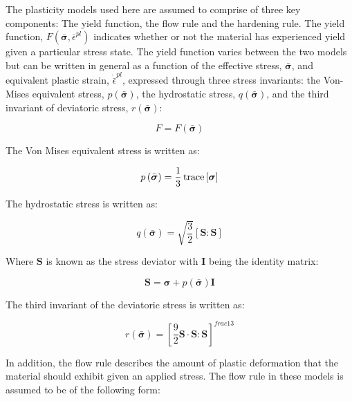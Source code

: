 The plasticity models used here are assumed to comprise of three key components: The yield function, the flow rule and the hardening rule. The yield function, $F\left(\bar{\boldsymbol{\sigma}},\bar{\epsilon}^{pl}\right)$ indicates whether or not the material has experienced yield given a particular stress state. The yield function varies between the two models but can be written in general as a function of the effective stress, $\bar{\boldsymbol{\sigma}}$, and equivalent plastic strain, $\dot{\bar{\epsilon}}^{pl}$, expressed through three stress invariants: the Von-Mises equivalent stress, $p\left(\bar{\boldsymbol{\sigma}}\right)$, the hydrostatic stress, $q\left(\bar{\boldsymbol{\sigma}}\right)$, and the third invariant of deviatoric stress, $r\left(\bar{\boldsymbol{\sigma}}\right)$:

\begin{equation}
    F = F\left(\bar{\boldsymbol{\sigma}}\right)
\label{eqn:gen1}
\end{equation}

The Von Mises equivalent stress is written as:

\begin{equation}
p\left(\bar{\boldsymbol{\sigma}}\right) = \frac{1}{3}\operatorname{trace}\left[\boldsymbol{\sigma}\right]
\label{eqn:gen2}
\end{equation}

The hydrostatic stress is written as:

\begin{equation}
q\left(\bar{\boldsymbol{\sigma}}\right)=\sqrt{\frac{3}{2}}\left[\mathbf{S}:\mathbf{S}\right]
\label{eqn:gen3}
\end{equation}

Where $\mathbf{S}$ is known as the stress deviator with $\mathbf{I}$ being the identity matrix:

\begin{equation}
\mathbf{S}=\boldsymbol{\sigma}+p\left(\bar{\boldsymbol{\sigma}}\right)\mathbf{I}
\label{eqn:gen4}
\end{equation}

The third invariant of the deviatoric stress is written as:

\begin{equation}
r\left(\bar{\boldsymbol{\sigma}}\right)=\left[\frac{9}{2}\mathbf{S}\cdot\mathbf{S}:\mathbf{S}\right]^{frac{1}{3}}
\label{eqn:gen5}
\end{equation}

In addition, the flow rule describes the amount of plastic deformation that the material should exhibit given an applied stress. The flow rule in these models is assumed to be of the following form:

